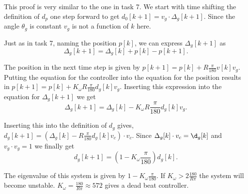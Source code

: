This proof is very similar to the one in task 7. We start with time shifting the definition of $d_p$ one step forward to get $d_0[k+1] =  v_g \cdot \Delta_g[k+1].$ Since the angle $\theta_g$ is constant $v_g$ is not a function of $k$ here.  

Just as in task 7, naming the position $p[k]$, we can express $\Delta_g[k+1]$ as
\begin{equation*}
\Delta_g[k+1] = \Delta_g[k] + p[k] - p[k+1].
\end{equation*}

The position in the next time step is given by $p[k+1] = p[k] + R\frac{\pi}{180}v[k] v_g.$ Putting the equation for the controller into the equation for the position results in $p[k+1] = p[k] + K_\omega R\frac{\pi}{180}d_g[k] v_g.$
Inserting this expression into the equation for $\Delta_g[k+1]$ we get 
\begin{equation*}
\Delta_g[k+1] = \Delta_g[k] - K_\omega R\frac{\pi}{180}d_g[k] v_g. 
\end{equation*}

Inserting this into the definition of $d_g$ gives, $d_g [k+1] = (\Delta_g[k] - R\frac{\pi}{180}d_g[k] v_c)\cdot v_c.$ Since $\Delta_g[k] \cdot v_c = \d_g[k]$ and $v_g\cdot v_g = 1$ we finally get
\begin{equation*}
d_g [k+1] = (1-K_\omega \frac{\pi}{180})d_g[k].
\end{equation*}

The eigenvalue of this system is given by $1-K_\omega \frac{\pi}{180}.$ If $K_\omega > 2\frac{180}{R \pi}$ the system will become unstable. $K_\omega = \frac{180}{R \pi} \approx 572$ gives a dead beat controller.